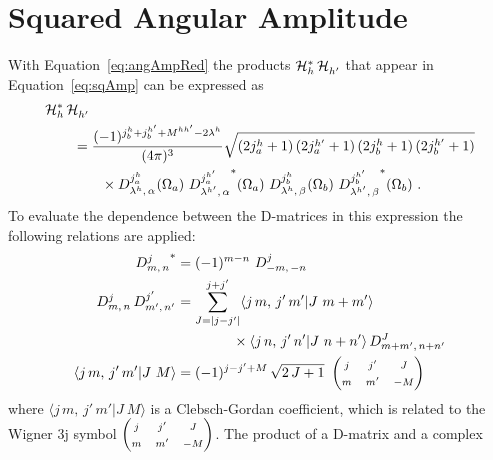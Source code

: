 \section{Squared Angular Amplitude}
\label{sec:angularDecay_squareAmp}

With Equation~\ref{eq:angAmpRed} the products $\angAmp[h]^*\,\angAmp[h']^{\phantom{*}}$ that appear in Equation~\ref{eq:sqAmp} can be
expressed as
\begin{equation}
  \label{eq:angAmpSq}
  \begin{aligned}
    &\angAmp[h]^*\,\angAmp[h']^{\phantom{*}} \\
    &\qquad=\frac{(-1)^{j_b^h+j_b^{h'}+M^{hh'}-2\lambda^h}}{(4\pi)^{3}}
      \sqrt{(2j_a^h+1)\, (2j_a^{h'}+1)\, (2j_b^h+1)\, (2j_b^{h'}+1)}\\
      &\qquad\qquad\times
        \WD{j_a^h}{\lambda^h}{\alpha}{}(\Omega_a)\ \WD{j_a^{h'}}{\lambda^{h'}}{\alpha}{*}(\Omega_a)\
        \WD{j_b^h}{\lambda^h}{\beta}{}(\Omega_b)\ \WD{j_b^{h'}}{\lambda^{h'}}{\beta}{*}(\Omega_b)\ .
  \end{aligned}
\end{equation}
To evaluate the dependence between the D-matrices in this expression the following relations are applied:
\begin{subequations}
  \label{eq:Dprops}
  \begin{align}
    \WD{j}{m}{n}{*} &= (-1)^{m-n}\ \WD{j}{-m}{-n}{} \\
    \WD{j}{m}{n}\,\WD{j'}{m'}{n'}{}
      &= \sum_{J=|j-j'|}^{j+j'}
      \langle j\,m,\,j'\,m'|J\ m+m' \rangle \nonumber\\
      &\qquad\qquad\times
      \langle j\,n,\,j'\,n'|J\ n+n' \rangle\,
      \WD{J}{m+m'}{n+n'}{} \\
    \langle j\,m,\,j'\,m'|J\ M \rangle
      &= (-1)^{j-j'+M}\,\sqrt{2\,J+1}\
      \begin{pmatrix}
        \mss{j} & \mss{j'} & \mss{J} \\
        \mss{m} & \mss{m'} & \mss{-M}
      \end{pmatrix}
  \end{align}
\end{subequations}
where $\langle j\,m,\,j'\,m'|J\ M \rangle$ is a Clebsch-Gordan coefficient, which is related to the Wigner 3j symbol
$\begin{pmatrix} \mss{j} & \mss{j'} & \mss{J} \\ \mss{m} & \mss{m'} & \mss{-M} \end{pmatrix}$. The product of a D-matrix and a complex
